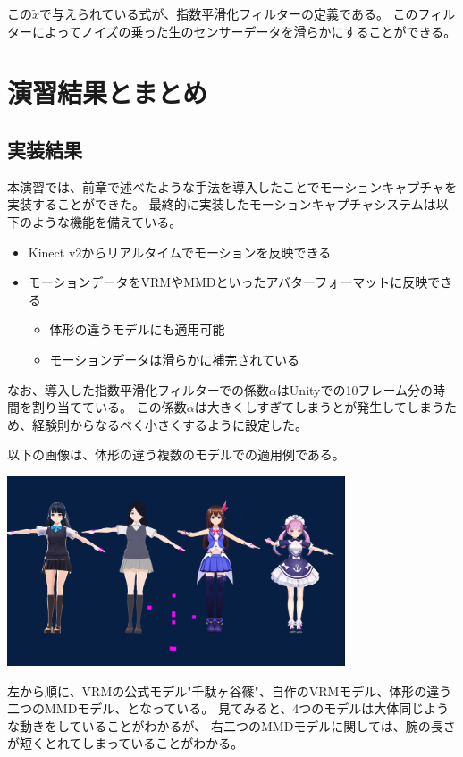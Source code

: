 \documentclass[a4j]{jsarticle}
\begin{document}
この$\tilde{x}$で与えられている式が、指数平滑化フィルターの定義である。
このフィルターによってノイズの乗った生のセンサーデータを滑らかにすることができる。

\section{演習結果とまとめ}

\subsection{実装結果}

本演習では、前章で述べたような手法を導入したことでモーションキャプチャを実装することができた。
最終的に実装したモーションキャプチャシステムは以下のような機能を備えている。

\begin{itemize}
  \item Kinect v2からリアルタイムでモーションを反映できる
  \item モーションデータをVRMやMMDといったアバターフォーマットに反映できる
  \begin{itemize}
  \item 体形の違うモデルにも適用可能
  \item モーションデータは滑らかに補完されている
  \end{itemize}
\end{itemize}

なお、導入した指数平滑化フィルターでの係数$\alpha$はUnityでの10フレーム分の時間を割り当てている。
この係数$\alpha$は大きくしすぎてしまうとが発生してしまうため、経験則からなるべく小さくするように設定した。

以下の画像は、体形の違う複数のモデルでの適用例である。

\includegraphics[width=10cm]{img/kekka.png}

左から順に、VRMの公式モデル"千駄ヶ谷篠"、自作のVRMモデル、体形の違う二つのMMDモデル、となっている。
見てみると、4つのモデルは大体同じような動きをしていることがわかるが、
右二つのMMDモデルに関しては、腕の長さが短くとれてしまっていることがわかる。
\end{document}
